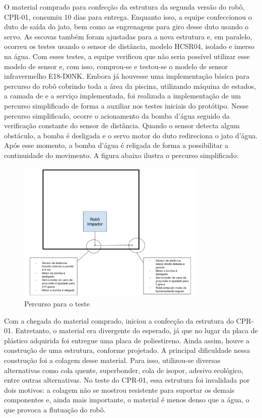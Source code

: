 O material comprado para confecção da estrutura da segunda versão do robô, CPR-01, consumiu 10 dias para entrega. Enquanto isso, a equipe confeccionou o duto de saída do jato, bem como as engrenagens para giro desse duto usando o servo. As escovas também foram ajustadas para a nova estrutura e, em paralelo, ocorreu os testes usando o sensor de distância, modelo HCSR04, isolado e imerso na água. Com esses testes, a equipe verificou que não seria possível utilizar esse modelo de sensor e, com isso, comprou-se e testou-se o modelo de sensor infravermelho E18-D0NK. Embora já houvesse uma implementação básica para percurso do robô cobrindo toda a área da piscina, utilizando máquina de estados, a camada de e a serviço implementada, foi realizada a implementação de um percurso simplificado de forma a auxiliar nos testes iniciais do protótipo. Nesse percurso simplificado, ocorre o acionamento da bomba d’água seguido da verificação constante do sensor de distância. Quando o sensor detecta algum obstáculo, a bomba é desligada e o servo motor do duto redireciona o jato d’água. Após esse momento, a bomba d’água é religada de forma a possibilitar a continuidade do movimento. A figura abaixo ilustra o percurso simplificado:

\begin{figure}[h]
  \centering
  \includegraphics[width=0.8\textwidth]{figuras/cpr-01.png}
  \caption{Percurso para o teste}
  \label{fig:cpr-01}
\end{figure}
\FloatBarrier

Com a chegada do material comprado, iniciou a confecção da estrutura do CPR-01. Entretanto, o material era divergente do esperado, já que no lugar da placa de plástico adquirida foi entregue uma placa de poliestireno. Ainda assim, houve a construção de uma estrutura, conforme projetado. A principal dificuldade nessa construção foi a colagem desse material. Para isso, utilizou-se diversas alternativas como cola quente, superbonder, cola de isopor, adesivo ecológico, entre outras alternativas. No teste do CPR-01, essa estrutura foi invalidada por dois motivos: a colagem não se mostrou resistente para suportar os demais componentes e, ainda mais importante, o material é menos denso que a água, o que provoca a flutuação do robô.

